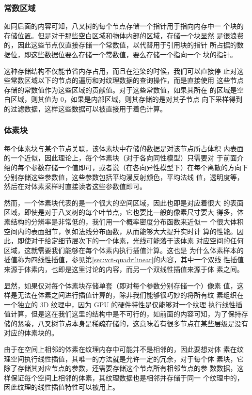 \subsubsection{常数区域}
如同后面的内容可知，八叉树的每个节点存储一个指针用于指向内存中一 个块的存储位置。但是对于那些空白区域和物体内部的区域，存储一个块显然 是很浪费的，因此这些节点仅直接存储一个常数值，以代替用于引用块的指针 所占据的数据位，即这些数据位要么存储一个常数值，要么存储一个指向一个 块的指针。

这种存储结构不仅能节省内存占用，而且在渲染的时候，我们可以直接停 止对这些常数区域以下的节点的遍历和对纹理数据的查询操作，而是直接使用 这些节点存储的常数值作为这些区域的贡献值。对于这些常数值，如果其所在 的区域是空白区域，则其值为 0，如果是内部区域，则其存储的是对其子节点 向下采样得到的过滤数据，这样这些数据可以被直接用于着色计算。



\subsubsection{体素块}
每个体素块与某个节点关联，该体素块中存储的数据是对该节点所占体积 内表面的一个近似，因此理论上，每个体素块（对于各向同性模型）只需要对 于前面介绍的每个参数存储一个值即可，或者说（在各向异性模型下）在每个离散的方向下分别存储这些参数值，这些参数包括平均漫反射颜色，平均法线 值，透明度等，然后在对体素采样时直接读者这些参数值即可。

然而，一个体素块代表的是一个很大的空间区域，因此也即是对应着很大 的表面区域，即使是对于八叉树的每个叶节点，它也要比一般的像素尺寸要大 得多，体素结构的分辨率是非常低的，我们用一个概率密度分布函数来近似一 个很大体积空间内的表面细节，例如法线分布函数，从而能够大大提升实时计 算的性能。因此，即使对于给定细节层次下的一个体素，光线可能落于该体素 对应空间的任何区域，这就需要我们能够在每个体素内执行插值计算。这也是 为什么体素样本的插值称为四线性插值，参见第\ref{sec:vct-quadrilinear}的内容，其中一个双线 性插值来源于体素内，也即是这里讨论的内容，而另一个双线性插值来源于体 素之间。

显然，如果仅对每个体素块存储单套（即对每个参数分别存储一个）像素 值，这样是无法在体素之间进行插值计算的，除非我们能够很巧妙的将所有纹 素组织在一个独立的 3D 纹理中，因为 GPU 的硬件特性是仅能够对一个纹理 执行线性插值计算，但是这在我们这里的结构中是不可行的，如前面的内容可知，为了保持存储的紧凑，八叉树节点本身是稀疏存储的，这意味着有很多节点在某些层级是没有对应的体素块的。

由于在空间上相邻的体素在纹理内存中可能并不是相邻的，因此要想对体 素在纹理空间执行线性插值，其唯一的方法就是允许一定的冗余，对于每个体 素块，它除了存储其对应节点的参数，还需要存储这个节点所有相邻节点的参 数数据，这样保证每个空间上相邻的体素，其纹理数据也是相邻并存储于同一 个纹理中的，因此纹理的线性插值特性可以被用上。

